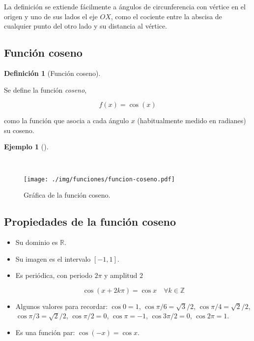 \documentclass[
  a4paper,
]{scrreport}
\theoremstyle{plain}
\theoremstyle{definition}
\theoremstyle{plain}
\theoremstyle{plain}
\theoremstyle{definition}
\newtheorem{example}{Ejemplo}[chapter]
\theoremstyle{definition}
\newtheorem{definition}{Definición}[chapter]
\theoremstyle{remark}
\begin{document}
La definición se extiende fácilmente a ángulos de circunferencia con
vértice en el origen y uno de sus lados el eje \(OX\), como el cociente
entre la abscisa de cualquier punto del otro lado y su distancia al
vértice.

\subsection{Función coseno}\label{funciuxf3n-coseno}

\begin{definition}[Función
coseno]\protect\hypertarget{def-funcion-coseno}{}\label{def-funcion-coseno}

Se define la función \emph{coseno},

\[f(x)=\cos(x)\]

como la función que asocia a cada ángulo \(x\) (habitualmente medido en
radianes) su coseno.

\end{definition}

\begin{example}[]\protect\hypertarget{exm-grafica-funcion-coseno}{}\label{exm-grafica-funcion-coseno}

~

\begin{figure}[H]

{\centering \texttt{[image: ./img/funciones/funcion-coseno.pdf]}

}

\caption{Gráfica de la función coseno.}

\end{figure}%

\end{example}

\subsection{Propiedades de la función
coseno}\label{propiedades-de-la-funciuxf3n-coseno}

\begin{itemize}
\item
  Su dominio es \(\mathbb{R}\).
\item
  Su imagen es el intervalo \([-1,1]\).
\item
  Es periódica, con periodo \(2\pi\) y amplitud \(2\)

  \[\cos (x+2k\pi)= \cos x\quad \forall k\in \mathbb{Z}\]
\item
  Algunos valores para recordar: \(\cos 0=1\),
  \(\cos \pi/6= \sqrt{3}/2\), \(\cos \pi/4=\sqrt{2}/2\),
  \(\cos \pi/3= \sqrt{2}/2\), \(\cos \pi/2 =0\), \(\cos \pi = -1\),
  \(\cos 3\pi/2=0\), \(\cos 2\pi=1\).
\item
  Es una función par: \(\cos(-x)=\cos x\).
\end{itemize}
\end{document}
